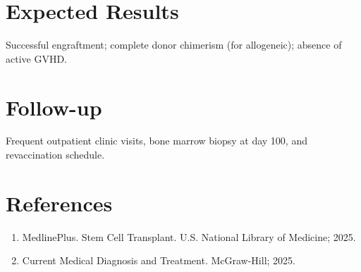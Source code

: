 \section*{Expected Results}
Successful engraftment; complete donor chimerism (for allogeneic); absence of active GVHD.

\section*{Follow-up}
Frequent outpatient clinic visits, bone marrow biopsy at day 100, and revaccination schedule.

\section*{References}
\begin{enumerate}
  \item MedlinePlus. Stem Cell Transplant. U.S. National Library of Medicine; 2025.
  \item Current Medical Diagnosis and Treatment. McGraw-Hill; 2025.
\end{enumerate}

\clearpage
